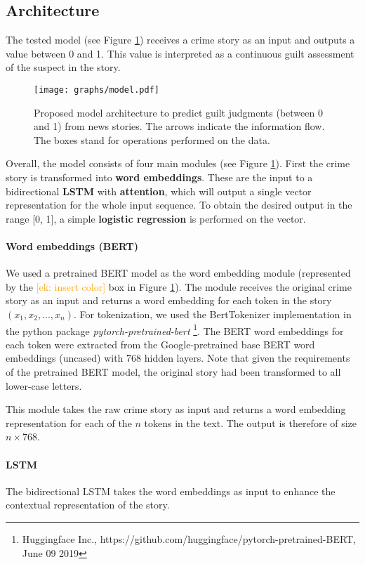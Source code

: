\documentclass[11pt,a4paper]{article}
\newcommand{\ek}[1]{\textcolor{Orange}{[ek: #1]}}
\begin{document}
\subsection{Architecture}
\label{model-architecture}
The tested model (see Figure \ref{fig:model}) receives a crime story as an input and outputs a value between 0 and 1. This value is interpreted as a continuous guilt assessment of the suspect in the story.

\begin{figure}
	\texttt{[image: graphs/model.pdf]}
	\caption{Proposed model architecture to predict guilt judgments (between 0 and 1) from news stories. The arrows indicate the information flow. The boxes stand for operations performed on the data.}
	\label{fig:model}
\end{figure}

Overall, the model consists of four main modules (see Figure \ref{fig:model}). First the crime story is transformed into \textbf{word embeddings}. These are the input to a bidirectional \textbf{LSTM} with \textbf{attention}, which will output a single vector representation for the whole input sequence. To obtain the desired output in the range [0, 1], a simple \textbf{logistic regression} is performed on the vector. 


\paragraph{Word embeddings (BERT)}
We used a pretrained BERT model as the word embedding module (represented by the \ek{insert color} box in Figure \ref{fig:model}). The module receives the original crime story as an input and returns a word embedding for each token in the story $(x_1, x_2, ..., x_n)$. For tokenization, we used the BertTokenizer implementation in the python package \textit{pytorch-pretrained-bert}
\footnote{Huggingface Inc., https:\slash \slash github.com\slash huggingface\slash pytorch-pretrained-BERT, June 09 2019}. 
The BERT word embeddings for each token were extracted from the Google-pretrained base BERT word embeddings (uncased) with 768 hidden layers. Note that given the requirements of the pretrained BERT model, the original story had been transformed to all lower-case letters.

This module takes the raw crime story as input and returns a word embedding representation for each of the $n$ tokens in the text. The output is therefore of size $n \times 768$.

\paragraph{LSTM}
The bidirectional LSTM takes the word embeddings as input to enhance the contextual representation of the story. 
\end{document}
